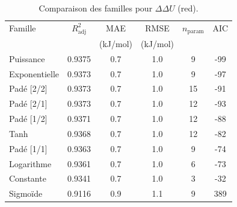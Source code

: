 \begin{table}[htbp]
\centering
\footnotesize
\caption{Comparaison des familles pour $\Delta\Delta U$ (red).}
\label{tab:s4_ddu_red_families}
\begin{tabular}{lccccc}
\toprule
Famille & $R^2_{\mathrm{adj}}$ & MAE & RMSE & $n_{\mathrm{param}}$ & AIC \\
 & & (kJ/mol) & (kJ/mol) & & \\
\midrule
Puissance & 0.9375 & 0.7 & 1.0 & 9 & -99 \\
Exponentielle & 0.9373 & 0.7 & 1.0 & 9 & -97 \\
Padé [2/2] & 0.9373 & 0.7 & 1.0 & 15 & -91 \\
Padé [2/1] & 0.9373 & 0.7 & 1.0 & 12 & -93 \\
Padé [1/2] & 0.9371 & 0.7 & 1.0 & 12 & -88 \\
Tanh & 0.9368 & 0.7 & 1.0 & 12 & -82 \\
Padé [1/1] & 0.9363 & 0.7 & 1.0 & 9 & -74 \\
Logarithme & 0.9361 & 0.7 & 1.0 & 6 & -73 \\
Constante & 0.9341 & 0.7 & 1.0 & 3 & -32 \\
Sigmoïde & 0.9116 & 0.9 & 1.1 & 9 & 389 \\
\bottomrule
\end{tabular}
\end{table}
